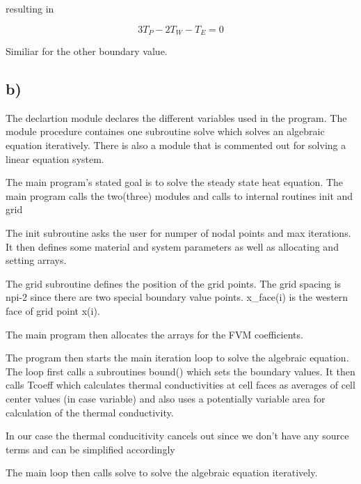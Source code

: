 \documentclass{article}
\begin{document}
resulting in

\begin{equation}
3 T_P - 2 T_W - T_E = 0 
\end{equation}

Similiar for the other boundary value.

\subsection{b)}
The declartion module declares the different variables used in the program. The module procedure containes one subroutine solve which solves an algebraic equation iteratively. There is also a module that is commented out for solving a linear equation system. 

The main program's stated goal is to solve the steady state heat equation. The main program calls the two(three) modules and calls to internal routines init and grid

The init subroutine asks the user for numper of nodal points and max iterations. It then defines some material and system parameters as well as allocating and setting arrays.

The grid subroutine defines the position of the grid points. The grid spacing is npi-2 since there are two special boundary value points. x_face(i) is the western face of grid point x(i).

The main program then allocates the arrays for the FVM coefficients.

The program then starts the main iteration loop to solve the algebraic equation. The loop first calls a subroutines bound() which sets the boundary values. It then calls Tcoeff which calculates thermal conductivities at cell faces as averages of cell center values (in case variable) and also uses a potentially variable area for calculation of the thermal conductivity. 

In our case the thermal conducitivity cancels out since we don't have any source terms and can be simplified accordingly

The main loop then calls solve to solve the algebraic equation iteratively.	
\end{document}
